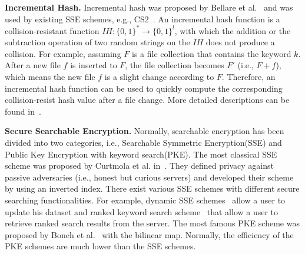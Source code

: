 \noindent\textbf{Incremental Hash.} Incremental hash was proposed by Bellare et al.~\cite{bellare1994incremental} and was used by existing SSE schemes, e.g., CS2~\cite{kamara2011cs2}. An incremental hash function is a collision-resistant function $IH: \{0,1\}^* \rightarrow \{0,1\}^l$, with which the addition or the subtraction operation of two random strings on the $IH$ does not produce a collision. For example, assuming $F$ is a file collection that contains the keyword $k$. After a new file $f$ is inserted to $F$, the file collection becomes $F'$ (i.e., $F+f$), which means the new file $f$ is a slight change according to $F$.  Therefore, an incremental hash function can be used to quickly compute the corresponding collision-resist hash value after a file change. More detailed descriptions can be found in~\cite{kamara2011cs2}.


\noindent\textbf{Secure Searchable Encryption.}  Normally, searchable encryption has been divided into two categories, i.e.,  Searchable Symmetric Encryption(SSE) and Public Key Encryption with keyword search(PKE). The most classical SSE scheme was proposed by Curtmola et al. in~\cite{curtmola2011searchable}. They defined  privacy against passive adversaries (i.e., honest but curious servers) and developed their scheme by using an inverted index. There exist various SSE schemes with different secure searching functionalities. For example, dynamic SSE schemes~\cite{kamara2012dynamic,cash2014dynamic,stefanov2014practical} allow a user to update his dataset and ranked keyword search scheme~\cite{wang2010secure} that allow a user to retrieve  ranked search results from the server. The most famous PKE scheme was proposed by Boneh et al.~\cite{boneh2004public} with the bilinear map. Normally, the efficiency of the PKE schemes are much lower than the SSE schemes.
